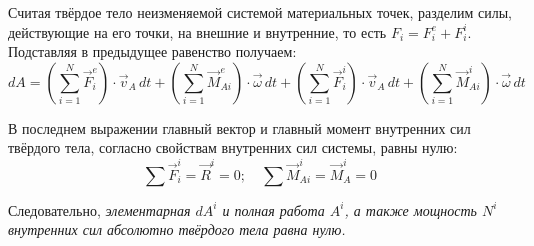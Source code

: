 Считая твёрдое тело неизменяемой системой материальных точек, разделим силы, 
действующие на его точки, на внешние и внутренние, то есть 
\( F_i = F^e_i + F^i_i \). Подставляя в предыдущее равенство получаем:
\[ 
	dA = \left( \sum_{i=1}^{N} \vec{F}^e_i \right)\cdot\vec{v}_A\,dt + 
	\left( \sum_{i=1}^{N} \vec{M}_{Ai}^e \right)\cdot\vec{\omega}\,dt +
	\left( \sum_{i=1}^{N} \vec{F}^i_i \right)\cdot\vec{v}_A\,dt + 
	\left( \sum_{i=1}^{N} \vec{M}_{Ai}^i \right)\cdot\vec{\omega}\,dt
\]

В последнем выражении главный вектор и главный момент внутренних сил 
твёрдого тела, согласно свойствам внутренних сил системы, равны нулю:
\[ 
	\sum\vec{F}^i_i = \vec{R}^i = 0;\quad 
	\sum\vec{M}_{Ai}^i = \vec{M}^i_A = 0
\]

Следовательно, \emph{элементарная \( dA^i\) и полная работа \( A^i \), 
а также мощность \( N^i \) внутренних сил абсолютно твёрдого тела 
равна нулю.}

\newpage
